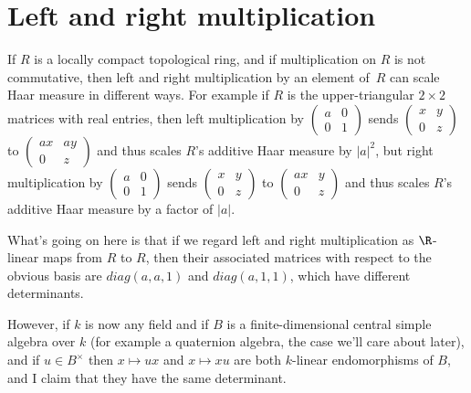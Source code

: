 \section{Left and right multiplication}

If $R$ is a locally compact topological ring, and if multiplication on $R$ is not commutative,
then left and right multiplication by an element of~$R$ can scale Haar measure in different ways.
For example if $R$ is the upper-triangular $2\times 2$ matrices with real
entries, then left multiplication by $\begin{pmatrix}a&0\\0&1\end{pmatrix}$
sends $\begin{pmatrix}x&y\\0&z\end{pmatrix}$ to $\begin{pmatrix}ax&ay\\0&z\end{pmatrix}$
and thus scales $R$'s additive
Haar measure by $|a|^2$, but right multiplication by $\begin{pmatrix}a&0\\0&1\end{pmatrix}$
sends $\begin{pmatrix}x&y\\0&z\end{pmatrix}$ to $\begin{pmatrix}ax&y\\0&z\end{pmatrix}$
and thus scales $R$'s additive Haar measure by a factor of $|a|$.

What's going on here is that if we regard left and right multiplication as $\R$-linear
maps from $R$ to $R$, then their associated matrices with respect to the obvious basis
are $diag(a,a,1)$ and $diag(a,1,1)$, which have different determinants.

However, if $k$ is now any field and if $B$ is a finite-dimensional central
simple algebra over $k$ (for example a quaternion algebra, the case we'll care about later),
and if $u\in B^\times$ then $x\mapsto ux$ and $x\mapsto xu$
are both $k$-linear endomorphisms of $B$, and I claim that they have
the same determinant.

